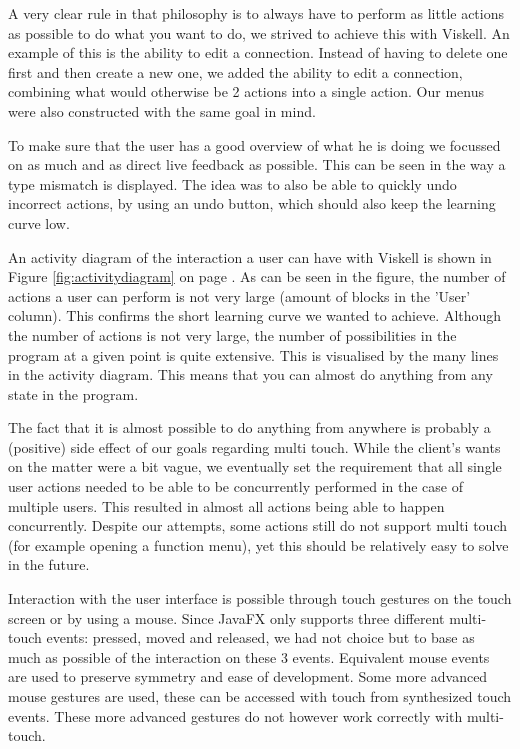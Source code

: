 A very clear rule in that philosophy is to always have to perform as little actions as possible to do what you want to do, we strived to achieve this with Viskell. An example of this is the ability to edit a connection. Instead of having to delete one first and then create a new one, we added the ability to edit a connection, combining what would otherwise be 2 actions into a single action. Our menus were also constructed with the same goal in mind.

To make sure that the user has a good overview of what he is doing we focussed on as much and as direct live feedback as possible. This can be seen in the way a type mismatch is displayed. The idea was to also be able to quickly undo incorrect actions, by using an undo button, which should also keep the learning curve low.

An activity diagram of the interaction a user can have with Viskell is shown in Figure \ref{fig:activitydiagram} on page \pageref{fig:activitydiagram}. As can be seen in the figure, the number of actions a user can perform is not very large (amount of blocks in the 'User' column). This confirms the short learning curve we wanted to achieve. Although the number of actions is not very large, the number of possibilities in the program at a given point is quite extensive. This is visualised by the many lines in the activity diagram. This means that you can almost do anything from any state in the program.

The fact that it is almost possible to do anything from anywhere is probably a (positive) side effect of our goals regarding multi touch. While the client's wants on the matter were a bit vague, we eventually set the requirement that all single user actions needed to be able to be concurrently performed in the case of multiple users. This resulted in almost all actions being able to happen concurrently. Despite our attempts, some actions still do not support multi touch (for example opening a function menu), yet this should be relatively easy to solve in the future.

Interaction with the user interface is possible through touch gestures on the touch screen or by using a mouse. Since JavaFX only supports three different multi-touch events: pressed, moved and released, we had not choice but to base as much as possible of the interaction on these 3 events. Equivalent mouse events are used to preserve symmetry and ease of development. Some more advanced mouse gestures are used, these can be accessed with touch from synthesized touch events. These more advanced gestures do not however work correctly with multi-touch.





